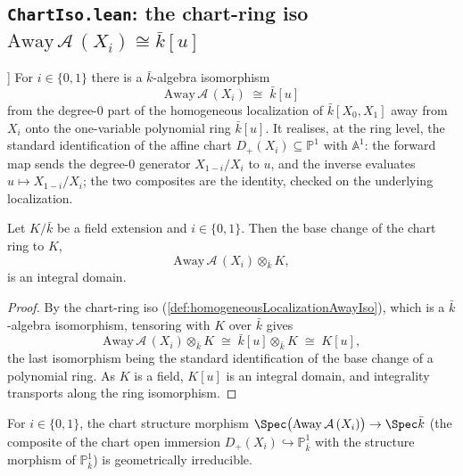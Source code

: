 \subsection*{\texttt{ChartIso.lean}: the chart-ring iso \(\mathrm{Away}\,\mathcal A\,(X_i) \cong \bar k[u]\)}
\begin{definition}\leanok
[The chart-ring iso \(\mathrm{Away}\,\mathcal A\,(X_i) \cong \bar k[u]\)]
  \label{def:homogeneousLocalizationAwayIso}
  For \(i \in \{0, 1\}\) there is a \(\bar k\)-algebra isomorphism
  \[ \mathrm{Away}\,\mathcal A\,(X_i) \;\cong\; \bar k[u] \]
  from the degree-\(0\) part of the homogeneous localization of \(\bar k[X_0, X_1]\) away from
  \(X_i\) onto the one-variable polynomial ring \(\bar k[u]\). It realises, at the ring level,
  the standard identification of the affine chart \(D_+(X_i) \subseteq \mathbb P^1\) with
  \(\mathbb A^1\): the forward map sends the degree-\(0\) generator \(X_{1-i}/X_i\) to \(u\), and
  the inverse evaluates \(u \mapsto X_{1-i}/X_i\); the two composites are the identity, checked on
  the underlying localization.
\end{definition}
\begin{lemma}
  \label{lem:chartAway_tensor_isDomain}
  Let \(K/\bar k\) be a field extension and \(i \in \{0, 1\}\). Then the base change of the chart
  ring to \(K\),
  \[ \mathrm{Away}\,\mathcal A\,(X_i) \otimes_{\bar k} K, \]
  is an integral domain.
\end{lemma}
\begin{proof}\leanok
  By the chart-ring iso (\cref{def:homogeneousLocalizationAwayIso}), which is a
  \(\bar k\)-algebra isomorphism, tensoring with \(K\) over \(\bar k\) gives
  \[ \mathrm{Away}\,\mathcal A\,(X_i) \otimes_{\bar k} K \;\cong\; \bar k[u] \otimes_{\bar k} K
     \;\cong\; K[u], \]
  the last isomorphism being the standard identification of the base change of a polynomial ring.
  As \(K\) is a field, \(K[u]\) is an integral domain, and integrality transports along the ring
  isomorphism.
\end{proof}
\begin{lemma}
  \label{lem:chartAway_geomIrred}
  For \(i \in \{0, 1\}\), the chart structure morphism
  \(\Spec\bigl(\mathrm{Away}\,\mathcal A\,(X_i)\bigr) \to \Spec \bar k\) (the composite of the
  chart open immersion \(D_+(X_i) \hookrightarrow \mathbb P^1_{\bar k}\) with the structure
  morphism of \(\mathbb P^1_{\bar k}\)) is geometrically irreducible.
\end{lemma}
